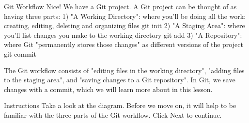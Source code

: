 Git Workflow
    Nice! We have a Git project. A Git project can be thought of as having three parts:
        1) "A Working Directory": where you’ll be doing all the work: creating, editing, deleting and organizing files
            git init
        2) "A Staging Area": where you’ll list changes you make to the working directory
            git add
        3) "A Repository": where Git "permanently stores those changes" as different versions of the project
            git commit
            
    The Git workflow consists of "editing files in the working directory", "adding files to the staging area", and "saving changes to a Git repository". In Git, we save changes with a commit, which we will learn more about in this lesson.

Instructions
    Take a look at the diagram. Before we move on, it will help to be familiar with the three parts of the Git workflow. Click Next to continue.
